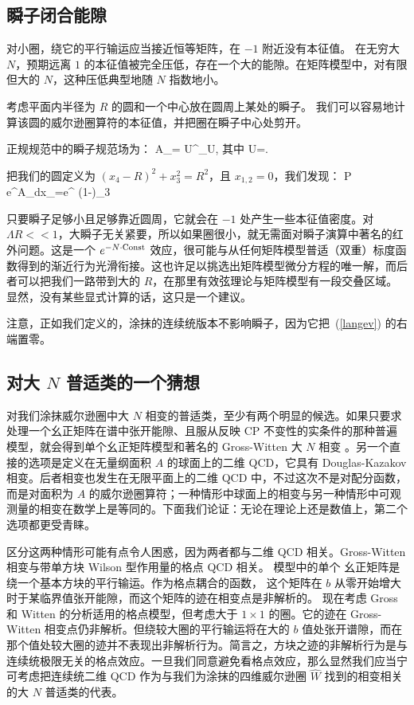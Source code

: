 \subsection{瞬子闭合能隙}

对小圈，绕它的平行输运应当接近恒等矩阵，在 $-1$ 附近没有本征值。
在无穷大 $N$，预期远离 $1$ 的本征值被完全压低，存在一个大的能隙。在矩阵模型中，对有限但大的
$N$，这种压低典型地随 $N$ 指数地小。

考虑平面内半径为 $R$ 的圆和一个中心放在圆周上某处的瞬子。
我们可以容易地计算该圆的威尔逊圈算符的本征值，并把圈在瞬子中心处剪开。

正规规范中的瞬子规范场为：
\be
A_\mu=\imath{} U^\dagger \partial_\mu U,
\ee
其中
\be
U=.
\ee

把我们的圆定义为 $(x_4-R)^2+x_3^2=R^2$，且 $x_{1,2}=0$，我们发现：
\be
{\cal P} e^{\imath\oint A_\mu dx_\mu}=e^{\imath\pi
(1-)\sigma_3 }  \ee



只要瞬子足够小且足够靠近圆周，它就会在
$-1$ 处产生一些本征值密度。对 $\Lambda R <<1$，大瞬子无关紧要，所以如果圈很小，就无需面对瞬子演算中著名的红外问题。这是一个 $e^{-N\cdot {\rm Const}}$ 效应，很可能与从任何矩阵模型普适（双重）标度函数得到的渐近行为光滑衔接。这也许足以挑选出矩阵模型微分方程的唯一解，而后者可以把我们一路带到大的 $R$，在那里有效弦理论与矩阵模型有一段交叠区域。显然，没有某些显式计算的话，这只是一个建议。

注意，正如我们定义的，涂抹的连续统版本不影响瞬子，因为它把~(\ref{langev}) 的右端置零。

\subsection{对大 $N$ 普适类的一个猜想}



对我们涂抹威尔逊圈中大 $N$ 相变的普适类，至少有两个明显的候选。如果只要求处理一个幺正矩阵在谱中张开能隙、且服从反映 CP 不变性的实条件的那种普遍模型，就会得到单个幺正矩阵模型和著名的 Gross-Witten 大 $N$
相变 \cite{gw12}。另一个直接的选项是定义在无量纲面积 $A$ 的球面上的二维 QCD，它具有 Douglas-Kazakov 相变。后者相变也发生在无限平面上的二维 QCD 中，不过这次不是对配分函数，而是对面积为 $A$ 的威尔逊圈算符；一种情形中球面上的相变与另一种情形中可观测量的相变在数学上是等同的。下面我们论证：无论在理论上还是数值上，第二个选项都更受青睐。

区分这两种情形可能有点令人困惑，因为两者都与二维 QCD 相关。Gross-Witten
相变与带单方块 Wilson 型作用量的格点 QCD 相关。
模型中的单个
幺正矩阵是绕一个基本方块的平行输运。作为格点耦合的函数，
这个矩阵在 $b$ 从零开始增大时于某临界值张开能隙，而这个矩阵的迹在相变点是非解析的。
现在考虑 Gross 和 Witten 的分析适用的格点模型，但考虑大于 $1\times 1$ 的圈。它的迹在 Gross-Witten 相变点仍非解析。但绕较大圈的平行输运将在大的 $b$ 值处张开谱隙，而在那个值处较大圈的迹并不表现出非解析行为。简言之，方块之迹的非解析行为是与连续统极限无关的格点效应。一旦我们同意避免看格点效应，那么显然我们应当宁可考虑把连续统二维 QCD 作为与我们为涂抹的四维威尔逊圈 ${\hat W}$ 找到的相变相关的大 $N$ 普适类的代表。

